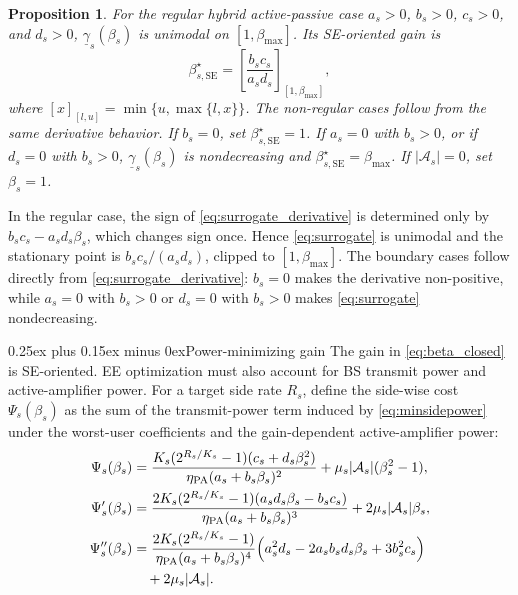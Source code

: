 \documentclass[journal]{IEEEtran}
\makeatletter
\def\subsection{\@startsection{subsection}{2}{\z@}{1.05ex plus 0.35ex minus 0.2ex}%
{0.25ex plus 0.15ex minus 0ex}{\normalfont\normalsize\itshape}}%
\newtheorem{proposition}{Proposition}
\makeatother
\begin{document}
\begin{proposition}\label{prop:se_optimal}
For the regular hybrid active-passive case $a_s>0$, $b_s>0$, $c_s>0$, and $d_s>0$, $\underline{\gamma}_s(\beta_s)$ is unimodal on $[1,\beta_{\max}]$. Its SE-oriented gain is
\begin{equation}
\beta_{s,\mathrm{SE}}^\star=
\left[\frac{b_sc_s}{a_sd_s}\right]_{[1,\beta_{\max}]},
\label{eq:beta_closed}
\end{equation}
where $[x]_{[l,u]}=\min\{u,\max\{l,x\}\}$. The non-regular cases follow from the same derivative behavior. If $b_s=0$, set $\beta_{s,\mathrm{SE}}^\star=1$. If $a_s=0$ with $b_s>0$, or if $d_s=0$ with $b_s>0$, $\underline{\gamma}_s(\beta_s)$ is nondecreasing and $\beta_{s,\mathrm{SE}}^\star=\beta_{\max}$. If $|\mathcal{A}_s|=0$, set $\beta_s=1$.
\end{proposition}

\begin{IEEEproof}
In the regular case, the sign of \eqref{eq:surrogate_derivative} is determined only by $b_sc_s-a_sd_s\beta_s$, which changes sign once. Hence \eqref{eq:surrogate} is unimodal and the stationary point is $b_sc_s/(a_sd_s)$, clipped to $[1,\beta_{\max}]$. The boundary cases follow directly from \eqref{eq:surrogate_derivative}: $b_s=0$ makes the derivative non-positive, while $a_s=0$ with $b_s>0$ or $d_s=0$ with $b_s>0$ makes \eqref{eq:surrogate} nondecreasing.
\end{IEEEproof}

\subsection{Power-minimizing gain}
The gain in \eqref{eq:beta_closed} is SE-oriented. EE optimization must also account for BS transmit power and active-amplifier power. For a target side rate $R_s$, define the side-wise cost $\Psi_s(\beta_s)$ as the sum of the transmit-power term induced by \eqref{eq:minsidepower} under the worst-user coefficients and the gain-dependent active-amplifier power:
\begin{align}
\Psi_s(\beta_s)
&=\frac{K_s(2^{R_s/K_s}-1)(c_s+d_s\beta_s^2)}{\eta_{\mathrm{PA}}(a_s+b_s\beta_s)^2}
+\mu_s|\mathcal{A}_s|(\beta_s^2-1),
\label{eq:side_cost}\\
\Psi_s'(\beta_s)
&=\frac{2K_s(2^{R_s/K_s}-1)(a_sd_s\beta_s-b_sc_s)}{\eta_{\mathrm{PA}}(a_s+b_s\beta_s)^3}
+2\mu_s|\mathcal{A}_s|\beta_s,
\label{eq:side_derivative}\\
\Psi_s''(\beta_s)
&=\frac{2K_s(2^{R_s/K_s}-1)}{\eta_{\mathrm{PA}}(a_s+b_s\beta_s)^4}
\Big(a_s^2d_s-2a_sb_sd_s\beta_s+3b_s^2c_s\Big) \notag\\
&\quad +2\mu_s|\mathcal{A}_s|.
\label{eq:side_second}
\end{align}
\end{document}
